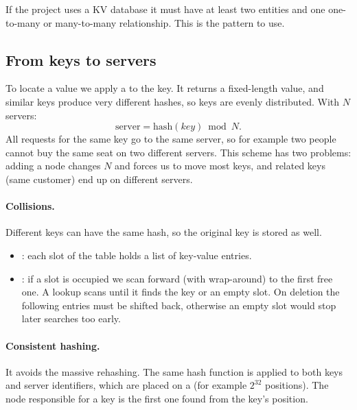 \begin{remark}
If the project uses a KV database it must have at least two entities and one one-to-many or many-to-many relationship. This is the pattern to use.
\end{remark}

\subsection{From keys to servers}
To locate a value we apply a  to the key. It returns a fixed-length value, and similar keys produce very different hashes, so keys are evenly distributed. With $N$ servers:
\[
\text{server} = \mathrm{hash}(key) \bmod N.
\]
All requests for the same key go to the same server, so for example two people cannot buy the same seat on two different servers. This scheme has two problems: adding a node changes $N$ and forces us to move most keys, and related keys (same customer) end up on different servers.

\paragraph{Collisions.} Different keys can have the same hash, so the original key is stored as well.
\begin{itemize}
  \item {}: each slot of the table holds a list of key-value entries.
  \item {}: if a slot is occupied we scan forward (with wrap-around) to the first free one. A lookup scans until it finds the key or an empty slot. On deletion the following entries must be shifted back, otherwise an empty slot would stop later searches too early.
\end{itemize}

\paragraph{Consistent hashing.} It avoids the massive rehashing. The same hash function is applied to both keys and server identifiers, which are placed on a  (for example $2^{32}$ positions). The node responsible for a key is the first one found  from the key's position.

\begin{center}
\end{center}

